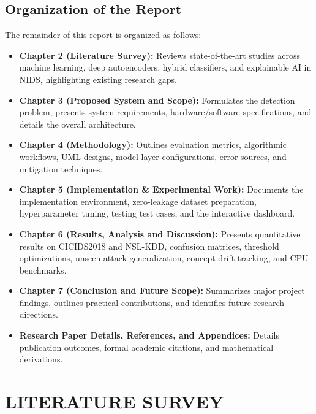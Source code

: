 \documentclass[12pt,a4paper]{report}
\begin{document}
\section{Organization of the Report}
The remainder of this report is organized as follows:
\begin{itemize}
    \item \textbf{Chapter 2 (Literature Survey):} Reviews state-of-the-art studies across machine learning, deep autoencoders, hybrid classifiers, and explainable AI in NIDS, highlighting existing research gaps.
    \item \textbf{Chapter 3 (Proposed System and Scope):} Formulates the detection problem, presents system requirements, hardware/software specifications, and details the overall architecture.
    \item \textbf{Chapter 4 (Methodology):} Outlines evaluation metrics, algorithmic workflows, UML designs, model layer configurations, error sources, and mitigation techniques.
    \item \textbf{Chapter 5 (Implementation \& Experimental Work):} Documents the implementation environment, zero-leakage dataset preparation, hyperparameter tuning, testing test cases, and the interactive dashboard.
    \item \textbf{Chapter 6 (Results, Analysis and Discussion):} Presents quantitative results on CICIDS2018 and NSL-KDD, confusion matrices, threshold optimizations, unseen attack generalization, concept drift tracking, and CPU benchmarks.
    \item \textbf{Chapter 7 (Conclusion and Future Scope):} Summarizes major project findings, outlines practical contributions, and identifies future research directions.
    \item \textbf{Research Paper Details, References, and Appendices:} Details publication outcomes, formal academic citations, and mathematical derivations.
\end{itemize}

\chapter{LITERATURE SURVEY}
\end{document}
